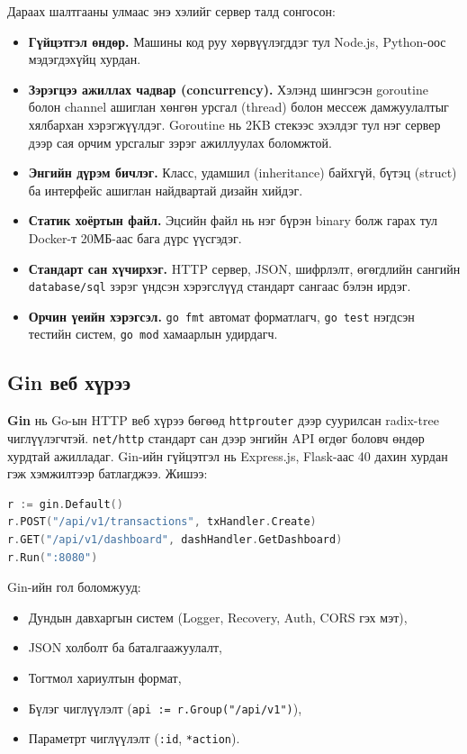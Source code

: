 Дараах шалтгааны улмаас энэ хэлийг сервер талд сонгосон:
\begin{itemize}
    \item \textbf{Гүйцэтгэл өндөр.} Машины код руу хөрвүүлэгддэг тул Node.js, Python-оос мэдэгдэхүйц хурдан.
    \item \textbf{Зэрэгцээ ажиллах чадвар (concurrency).} Хэлэнд шингэсэн goroutine болон channel ашиглан хөнгөн урсгал (thread) болон мессеж дамжуулалтыг хялбархан хэрэгжүүлдэг. Goroutine нь 2KB стекээс эхэлдэг тул нэг сервер дээр сая орчим урсгалыг зэрэг ажиллуулах боломжтой.
    \item \textbf{Энгийн дүрэм бичлэг.} Класс, удамшил (inheritance) байхгүй, бүтэц (struct) ба интерфейс ашиглан найдвартай дизайн хийдэг.
    \item \textbf{Статик хоёртын файл.} Эцсийн файл нь нэг бүрэн binary болж гарах тул Docker-т 20МБ-аас бага дүрс үүсгэдэг.
    \item \textbf{Стандарт сан хүчирхэг.} HTTP сервер, JSON, шифрлэлт, өгөгдлийн сангийн \texttt{database/sql} зэрэг үндсэн хэрэгслүүд стандарт сангаас бэлэн ирдэг.
    \item \textbf{Орчин үеийн хэрэгсэл.} \texttt{go fmt} автомат форматлагч, \texttt{go test} нэгдсэн тестийн систем, \texttt{go mod} хамаарлын удирдагч.
\end{itemize}

\subsection{Gin веб хүрээ}
\textbf{Gin} \cite{gin} нь Go-ын HTTP веб хүрээ бөгөөд \texttt{httprouter} дээр суурилсан radix-tree чиглүүлэгчтэй. \texttt{net/http} стандарт сан дээр энгийн API өгдөг боловч өндөр хурдтай ажилладаг. Gin-ийн гүйцэтгэл нь Express.js, Flask-аас 40 дахин хурдан гэж хэмжилтээр батлагджээ. Жишээ:

\begin{lstlisting}[language=Go, basicstyle=\ttfamily\footnotesize, caption={Gin REST API цэг}]
r := gin.Default()
r.POST("/api/v1/transactions", txHandler.Create)
r.GET("/api/v1/dashboard", dashHandler.GetDashboard)
r.Run(":8080")
\end{lstlisting}

Gin-ийн гол боломжууд:
\begin{itemize}
    \item Дундын давхаргын систем (Logger, Recovery, Auth, CORS гэх мэт),
    \item JSON холболт ба баталгаажуулалт,
    \item Тогтмол хариултын формат,
    \item Бүлэг чиглүүлэлт (\texttt{api := r.Group("/api/v1")}),
    \item Параметрт чиглүүлэлт (\texttt{:id}, \texttt{*action}).
\end{itemize}

